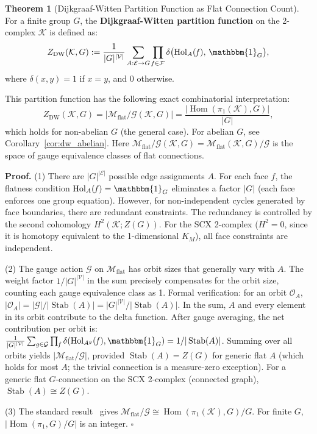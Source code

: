 \documentclass[12pt,a4paper]{article}
\theoremstyle{definition}
\newtheorem{theorem}{Theorem}[section]
\theoremstyle{remark}
\theoremstyle{definition}
\newcommand{\verts}{\mathcal{V}}
\newcommand{\edgs}{\mathcal{E}}
\newcommand{\faces}{\mathcal{F}}
\newcommand{\face}{\ensuremath{\mathit{f}}}
\newcommand{\Hol}{\mathrm{Hol}}
\newcommand{\DW}{\mathrm{DW}}
\newcommand{\Gflat}{\mathcal{M}_{\mathrm{flat}}}
\newcommand{\Gflatquot}{\mathcal{M}_{\mathrm{flat}}/\mathcal{G}}
\DeclareMathOperator{\Hom}{Hom}
\DeclareMathOperator{\Stab}{Stab}
\begin{document}
\begin{theorem}[Dijkgraaf-Witten Partition Function as Flat Connection Count]\label{thm:dw_partition}
For a finite group $G$, the \textbf{Dijkgraaf-Witten partition function} on the 2-complex $\mathcal{K}$ is defined as:
\[
    Z_{\DW}(\mathcal{K}, G) := \frac{1}{|G|^{|\verts|}}
    \sum_{A: \edgs \to G} \prod_{\face \in \faces} \delta\big(\Hol_A(\face),\, \mathbbm{1}_G\big),
\]
where $\delta(x, y) = 1$ if $x = y$, and $0$ otherwise.

This partition function has the following exact combinatorial interpretation:
\[
    Z_{\DW}(\mathcal{K}, G) = |\Gflatquot(\mathcal{K}, G)|
    = \frac{|\Hom(\pi_1(\mathcal{K}), G)|}{|G|},
\]
which holds for non-abelian $G$ (the general case). For abelian $G$, see Corollary~\ref{cor:dw_abelian}.
Here $\Gflatquot(\mathcal{K}, G) = \Gflat(\mathcal{K}, G) / \mathcal{G}$ is the space of gauge equivalence classes of flat connections.

\textbf{Proof.}
(1) There are $|G|^{|\edgs|}$ possible edge assignments $A$. For each face $\face$, the flatness condition $\Hol_A(\face) = \mathbbm{1}_G$
eliminates a factor $|G|$ (each face enforces one group equation). However, for non-independent cycles generated by face boundaries, there are redundant constraints.
The redundancy is controlled by the second cohomology $H^2(\mathcal{K}; Z(G))$. For the SCX 2-complex ($H^2 = 0$, since it is homotopy equivalent to the 1-dimensional $K_M$),
all face constraints are independent.

(2) The gauge action $\mathcal{G}$ on $\Gflat$ has orbit sizes that generally vary with $A$.
The weight factor $1/|G|^{|\verts|}$ in the sum precisely compensates for the orbit size, counting each gauge equivalence class as 1.
Formal verification: for an orbit $\mathcal{O}_A$, $|\mathcal{O}_A| = |\mathcal{G}|/|\Stab(A)| = |G|^{|\verts|}/|\Stab(A)|$.
In the sum, $A$ and every element in its orbit contribute to the delta function.
After gauge averaging, the net contribution per orbit is:
$\frac{1}{|G|^{|\verts|}} \sum_{g \in \mathcal{G}} \prod_{\face} \delta(\Hol_{A^g}(\face), \mathbbm{1}_G) = 1/|\Stab(A)|$.
Summing over all orbits yields $|\Gflatquot|$, provided $\Stab(A) = Z(G)$ for generic flat $A$ (which holds for most $A$; the trivial connection is a measure-zero exception).
For a generic flat $G$-connection on the SCX 2-complex (connected graph), $\Stab(A) \cong Z(G)$.

(3) The standard result~\cite{dijkgraaf1990,witten1991} gives $\Gflatquot \cong \Hom(\pi_1(\mathcal{K}), G)/G$.
For finite $G$, $|\Hom(\pi_1, G)/G|$ is an integer. $\square$
\end{theorem}
\end{document}
